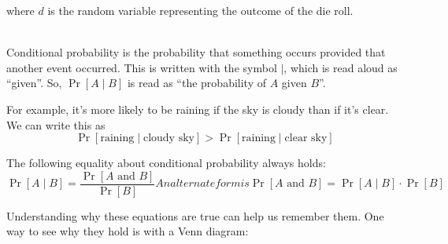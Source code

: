 \documentclass[12 pt]{article}
\newcounter{example}[section]
\begin{document}
where $d$ is the random variable representing the outcome of the die roll.

\hfill\\

Conditional probability is the probability that something occurs 
provided that another event occurred. This is written with the symbol 
$\mid$, which is read aloud as ``given''. So, $\Pr[A \mid B]$ is 
read as ``the probability of $A$ given $B$''.

For example, it's more likely to be raining if the sky is cloudy 
than if it's clear. We can write this as
\[
    \Pr[\text{raining} \mid \text{cloudy sky}] >
    \Pr[\text{raining} \mid \text{clear sky}]
\]

The following equality about conditional probability always holds:
\begin{subequations}\label{eq:conditional}
    \begin{equation}
        \Pr[A \mid B] = \frac{\Pr[A \text{ and } B]}{\Pr[B]}
        \label{eqn:conditional_mid}
    \end{equation}
An alternate form is
    \begin{equation}
        \Pr[A \text{ and } B] = \Pr[A \mid B] \cdot \Pr[B]
        \label{eqn:conditional_and}
    \end{equation}
\end{subequations}

Understanding why these equations are true can help us remember them.
One way to see why they hold is with a Venn diagram:

\begin{center}
\end{center}
\end{document}
